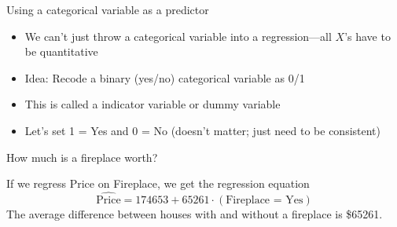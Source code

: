 \documentclass{beamer}\usepackage[]{graphicx}\usepackage[]{color}
\makeatletter
\newcommand{\hlnum}[1]{\textcolor[rgb]{0.824,0.412,0.118}{#1}}%
\newcommand{\hlopt}[1]{\textcolor[rgb]{1,0.894,0.769}{#1}}%
\newcommand{\hlstd}[1]{\textcolor[rgb]{1,0.894,0.769}{#1}}%
\newcommand{\hlkwd}[1]{\textcolor[rgb]{1,0.78,0.769}{#1}}%
\newenvironment{kframe}{%
 \def\at@end@of@kframe{}%
 \ifinner\ifhmode%
  \def\at@end@of@kframe{\end{minipage}}%
  \begin{minipage}{\columnwidth}%
 \fi\fi%
 \def\FrameCommand##1{\hskip\@totalleftmargin \hskip-\fboxsep
 \colorbox{shadecolor}{##1}\hskip-\fboxsep
     \hskip-\linewidth \hskip-\@totalleftmargin \hskip\columnwidth}%
 \MakeFramed {\advance\hsize-\width
   \@totalleftmargin\z@ \linewidth\hsize
   \@setminipage}}%
 {\par\unskip\endMakeFramed%
 \at@end@of@kframe}
\newenvironment{knitrout}{}{} %
\makeatother
\begin{document}
\begin{darkframes}
    \begin{frame}{Using a categorical variable as a predictor}
      \begin{itemize}[<+->]
        \item We can't just throw a categorical variable into a regression---all $X$'s have to be quantitative
        \item Idea: Recode a binary (yes/no) categorical variable as 0/1
        \item This is called a \alert{indicator variable} or \alert{dummy variable}
        \item Let's set 1 = Yes and 0 = No (doesn't matter; just need to be consistent)
      \end{itemize}
    \end{frame}

    \begin{frame}[fragile]{How much is a fireplace worth?}
      

      If we regress Price on Fireplace, we get the regression equation
      \[
        \widehat{\text{Price}} = 174653 + 65261\cdot(\text{Fireplace = Yes})
      \]
      The average difference between houses with and without a fireplace is \$65261.

    \end{frame}



\end{darkframes}
\end{document}
